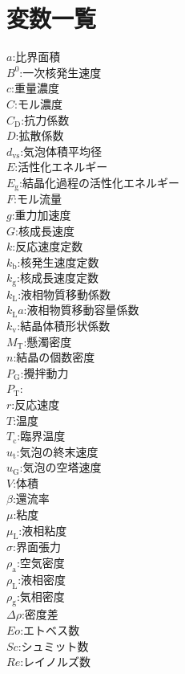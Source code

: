 \documentclass[a4j]{jsreport}
\begin{document}
\chapter*{変数一覧}
\begin{multicols}{2}
\begin{flushleft}
    $a$:比界面積 \\
    $B^0$:一次核発生速度 \\
    $c$:重量濃度 \\
    $C$:モル濃度 \\
    $C_\mathrm{D}$:抗力係数 \\
    $D$:拡散係数 \\
    $d_\mathrm{vs}$:気泡体積平均径 \\
    $E$:活性化エネルギー \\
    $E_\mathrm{g}$:結晶化過程の活性化エネルギー \\
    $F$:モル流量 \\
    $g$:重力加速度 \\
    $G$:核成長速度 \\
    $k$:反応速度定数 \\
    $k_\mathrm{b}$:核発生速度定数 \\
    $k_\mathrm{g}$:核成長速度定数 \\
    $k_\mathrm{L}$:液相物質移動係数 \\
    $k_\mathrm{L}a$:液相物質移動容量係数 \\
    $k_\mathrm{v}$:結晶体積形状係数 \\
    $M_\mathrm{T}$:懸濁密度 \\
    $n$:結晶の個数密度 \\
    $P_\mathrm{G}$:攪拌動力 \\
    $P_\mathrm{T}$: \\
    $r$:反応速度 \\
    $T$:温度 \\
    $T_\mathrm{c}$:臨界温度 \\
    $u_\mathrm{t}$:気泡の終末速度 \\
    $u_\mathrm{G}$:気泡の空塔速度 \\
    $V$:体積 \\
    $\beta$:還流率 \\
    $\mu$:粘度 \\
    $\mu_\mathrm{L}$:液相粘度 \\
    $\sigma$:界面張力 \\
    $\rho_\mathrm{a}$:空気密度 \\
    $\rho_\mathrm{L}$:液相密度 \\
    $\rho_\mathrm{g}$:気相密度 \\
    $\Delta\rho$:密度差 \\
    $Eo$:エトベス数 \\
    $Sc$:シュミット数 \\
    $Re$:レイノルズ数
\end{flushleft}
\end{multicols}
\end{document}
